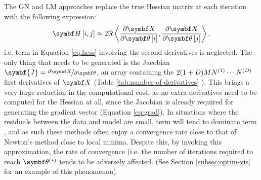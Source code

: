 The \ac{GN} and \ac{LM} approaches replace the true Hessian matrix at each
iteration with the following expression:
\begin{equation}
    \bdH \left[i, j\right] \approx 2 \Re
        \left\langle
            \frac{\partial \bX}{\partial \bth\left[i\right]},
            \frac{\partial \bX}{\partial \bth\left[j\right]}
        \right\rangle,
    \label{eq:hess-approx}
\end{equation}
i.e. term  in Equation \ref{eq:hess} involving the second derivatives is
neglected. The only thing that needs to be generated is the Jacobian
$\symbf{J} = \nicefrac{\partial \bX}{\partial \bth}$, an array containing the
$2(1+D)MN^{(1)}\cdots N^{(D)}$ first derivatives of $\bX$ (Table
\ref{tab:number-of-derivatives} ). This brings a very large reduction in the
computational cost, as no extra derivatives need to be computed for the Hessian
at all, since the Jacobian is already required for generating the gradient
vector (Equation \ref{eq:grad}). In situations where the residuals between the
data and model are small, term  will tend to dominate term
, and as such these methods often enjoy a convergence rate close
to that of Newton's method close to local minima.  Despite this, by invoking
this approximation, the rate of convergence (i.e. the number of iterations
required to reach $\bthstar$ tends to be adversely affected. (See Section
\ref{subsec:optim-vis} for an example of this phenomenon)

